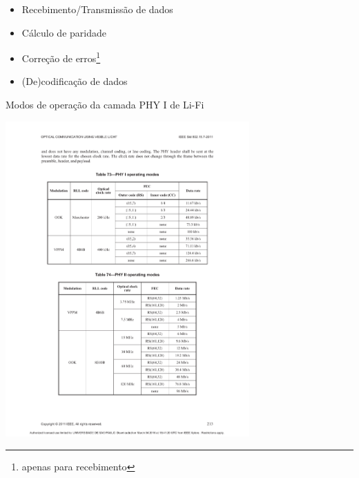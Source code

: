 	\begin{itemize}  
		\item Recebimento/Transmissão de dados
		\item Cálculo de paridade
		\item Correção de erros\footnote{apenas para recebimento}
		\item (De)codificação de dados
	\end{itemize}
	
	\begin{table}[htbp]
		\caption{\label{tab_phy1} Modos de operação da camada PHY I de Li-Fi}
		
		\centering
		\includegraphics[clip, trim=37mm 151mm 36mm 51mm,  width=0.7\textwidth]{pag213.pdf}
	\end{table}
	
